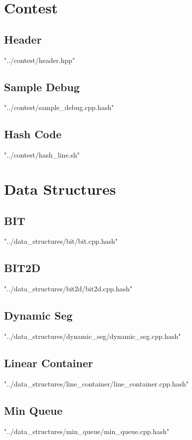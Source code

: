 \documentclass [12pt,onecolumn,oneside]{article}
\begin{document}
\pagestyle{fancy}
\fancyfoot{}
\fancyhead[R]{\thepage}
\renewcommand{\headrulewidth}{0.4pt}
\tableofcontents
\scriptsize

\bigskip

\newpage
\section{Contest}
\subsection{ Header}
 {"../contest/header.hpp"}
\subsection{ Sample Debug}
 {"../contest/sample_debug.cpp.hash"}
\subsection{ Hash Code}
 {"../contest/hash_line.sh"}
\newpage


\section{Data Structures}
\subsection{ BIT}
 {"../data_structures/bit/bit.cpp.hash"}
\subsection{ BIT2D}
 {"../data_structures/bit2d/bit2d.cpp.hash"}
\subsection{ Dynamic Seg}
 {"../data_structures/dynamic_seg/dynamic_seg.cpp.hash"}
\subsection{ Linear Container}
 {"../data_structures/line_container/line_container.cpp.hash"}
\subsection{ Min Queue}
 {"../data_structures/min_queue/min_queue.cpp.hash"}
\end{document}
